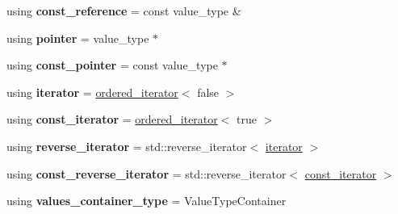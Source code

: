 \begin{DoxyCompactItemize}
\item 
\mbox{\label{classtsl_1_1detail__ordered__hash_1_1ordered__hash_a3ef2c7c6e46c43ce02aed27f44c30452}} 
using {\bfseries const\+\_\+reference} = const value\+\_\+type \&
\item 
\mbox{\label{classtsl_1_1detail__ordered__hash_1_1ordered__hash_ac4e053f630b968f7bf8d21bc00aed068}} 
using {\bfseries pointer} = value\+\_\+type $\ast$
\item 
\mbox{\label{classtsl_1_1detail__ordered__hash_1_1ordered__hash_a584cb2f4d6e7e7e8e1356a31677f24ec}} 
using {\bfseries const\+\_\+pointer} = const value\+\_\+type $\ast$
\item 
\mbox{\label{classtsl_1_1detail__ordered__hash_1_1ordered__hash_a67c369d7edd1131bf9e0a8ada4e4d094}} 
using {\bfseries iterator} = \mbox{\hyperlink{classtsl_1_1detail__ordered__hash_1_1ordered__hash_1_1ordered__iterator}{ordered\+\_\+iterator}}$<$ false $>$
\item 
\mbox{\label{classtsl_1_1detail__ordered__hash_1_1ordered__hash_a6dbac93fb19be2c2e929489fb0b5c385}} 
using {\bfseries const\+\_\+iterator} = \mbox{\hyperlink{classtsl_1_1detail__ordered__hash_1_1ordered__hash_1_1ordered__iterator}{ordered\+\_\+iterator}}$<$ true $>$
\item 
\mbox{\label{classtsl_1_1detail__ordered__hash_1_1ordered__hash_aa7801013d5f330513e4d9743b40f8cf1}} 
using {\bfseries reverse\+\_\+iterator} = std\+::reverse\+\_\+iterator$<$ \mbox{\hyperlink{classtsl_1_1detail__ordered__hash_1_1ordered__hash_1_1ordered__iterator}{iterator}} $>$
\item 
\mbox{\label{classtsl_1_1detail__ordered__hash_1_1ordered__hash_a2f2940b46a61dc1af261e2a40904a7b0}} 
using {\bfseries const\+\_\+reverse\+\_\+iterator} = std\+::reverse\+\_\+iterator$<$ \mbox{\hyperlink{classtsl_1_1detail__ordered__hash_1_1ordered__hash_1_1ordered__iterator}{const\+\_\+iterator}} $>$
\item 
\mbox{\label{classtsl_1_1detail__ordered__hash_1_1ordered__hash_ad907d82adf51d0502fe818a7131a0936}} 
using {\bfseries values\+\_\+container\+\_\+type} = Value\+Type\+Container
\end{DoxyCompactItemize}
